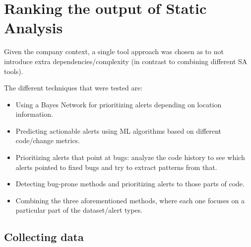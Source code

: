 
\section{Ranking the output of Static Analysis}\label{sec:ranking}


Given the company context, a single tool approach was chosen as to not introduce extra dependencies/complexity (in contrast to combining different SA tools). 

The different techniques that were tested are:
\begin{itemize}
    \item Using a Bayes Network for prioritizing alerts depending on location information.
    \item Predicting actionable alerts using ML algorithms based on different code/change metrics.
    \item Prioritizing alerts that point at bugs: analyze the code history to see which alerts pointed to fixed bugs and try to extract patterns from that.
    \item Detecting bug-prone methods and prioritizing alerts to those parts of code.
    \item Combining the three aforementioned methods, where each one focuses on a particular part of the dataset/alert types.
\end{itemize}


\subsection{Collecting data}


